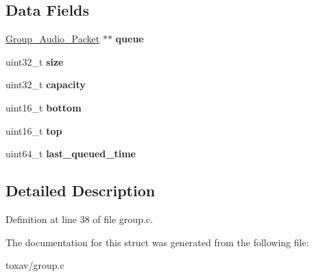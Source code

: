 \subsection*{Data Fields}
\begin{DoxyCompactItemize}
\item 
\hypertarget{struct_group___jitter_buffer_a9829940d971aa22eb04b318876afb018}{\hyperlink{struct_group___audio___packet}{Group\+\_\+\+Audio\+\_\+\+Packet} $\ast$$\ast$ {\bfseries queue}}\label{struct_group___jitter_buffer_a9829940d971aa22eb04b318876afb018}

\item 
\hypertarget{struct_group___jitter_buffer_ab2c6b258f02add8fdf4cfc7c371dd772}{uint32\+\_\+t {\bfseries size}}\label{struct_group___jitter_buffer_ab2c6b258f02add8fdf4cfc7c371dd772}

\item 
\hypertarget{struct_group___jitter_buffer_a391c992c66c3e5540265a85ec2b9216a}{uint32\+\_\+t {\bfseries capacity}}\label{struct_group___jitter_buffer_a391c992c66c3e5540265a85ec2b9216a}

\item 
\hypertarget{struct_group___jitter_buffer_a12c8099ac87952580dd090215e02728c}{uint16\+\_\+t {\bfseries bottom}}\label{struct_group___jitter_buffer_a12c8099ac87952580dd090215e02728c}

\item 
\hypertarget{struct_group___jitter_buffer_a0c235a6df98714bb18538fc0afc5bad1}{uint16\+\_\+t {\bfseries top}}\label{struct_group___jitter_buffer_a0c235a6df98714bb18538fc0afc5bad1}

\item 
\hypertarget{struct_group___jitter_buffer_abec0d4ef82ac14ce49e34eff86392f02}{uint64\+\_\+t {\bfseries last\+\_\+queued\+\_\+time}}\label{struct_group___jitter_buffer_abec0d4ef82ac14ce49e34eff86392f02}

\end{DoxyCompactItemize}


\subsection{Detailed Description}


Definition at line 38 of file group.\+c.



The documentation for this struct was generated from the following file\+:\begin{DoxyCompactItemize}
\item 
toxav/group.\+c\end{DoxyCompactItemize}
